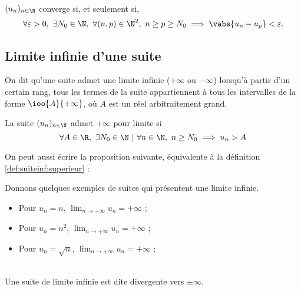 \documentclass[12pt,a4paper,frenchb]{article}
\begin{document}
\begin{remarque}~\\
  $(u_n)_{n\in\N}$ converge si, et seulement si, \[\forall \varepsilon >
  0,\ \exists N_0\in\N,\ \forall (n,p)\in\N^2,\ n\geq p\geq N_0 \implies
\vabs{u_n - u_p} < \varepsilon. \]
\end{remarque}

\subsection{Limite infinie d'une suite}

On dit qu'une suite admet une limite infinie ($+\infty$ ou $-\infty$)
lorsqu'à partir d'un certain rang, tous les termes de la suite
appartiennent à tous les intervalles de la forme $\ioo{A}{+\infty}$, où
$A$ est un réel arbitraitement grand.

\begin{definition}\label{def:suiteinf:superieur}
  La suite $(u_n)_{n\in\N}$ admet $+\infty$ pour limite si \[ \forall
    A\in\R,\ \exists N_0\in\N\ |\ \forall n\in\N,\ n\geq N_0 \implies
  u_n > A \]
\end{definition}

On peut aussi écrire la proposition suivante, équivalente à la
définition \ref{def:suiteinf:superieur} :

\framebox{
  \begin{minipage}{0.99\linewidth}
    $\lim_{n\to+\infty} u_n = +\infty$ si et seulement si tout
    intervalle de la forme $[A; +\infty [$ contient aussi tous les termes de
    la suite à partir d'un certain rang.
  \end{minipage}
}

Donnons quelques exemples de suites qui présentent une limite infinie.

\begin{itemize}
  \item Pour $u_n = n$, $\lim_{n\to +\infty}u_n = +\infty$ ;
  \item Pour $u_n = {n^2}$, $\lim_{n\to +\infty}u_n = +\infty$ ;
  \item Pour $u_n = \sqrt{n}$, $\lim_{n\to +\infty}u_n = +\infty$ ;
\end{itemize}

\begin{remarque}~\\
  Une suite de limite infinie est dite divergente vers $\pm\infty$.
\end{remarque}
\end{document}
